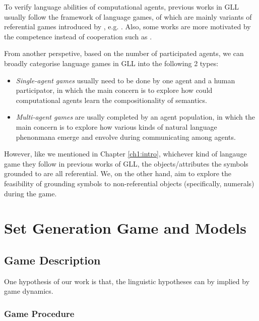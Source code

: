 \documentclass[msc,deptreport]{infthesis} %
\begin{document}
To verify language abilities of computational agents, previous works in GLL usually follow the framework of language games, of which are mainly variants of referential games introduced by \cite{lewis2008convention}, e.g. \cite{hermann2017grounded, havrylov2017emergence}. Also, some works are more motivated by the competence instead of cooperation such as \cite{cao2018emergent}.

From another perspetive, based on the number of participated agents, we can broadly categorise language games in GLL into the following 2 types:
\begin{itemize}
  \item \textit{Single-agent games} usually need to be done by one agent and a human participator, in which the main concern is to explore how could computational agents learn the compositionality of semantics.
  \item \textit{Multi-agent games} are usally completed by an agent population, in which the main concern is to explore how various kinds of natural language phenonmana emerge and envolve during communicating among agents.
\end{itemize}

However, like we mentioned in Chapter \ref{ch1:intro}, whichever kind of langauge game they follow in previous works of GLL, the objects/attributes the symbols grounded to are all referential. We, on the other hand, aim to explore the feasibility of grounding symbols to non-referential objects (specifically, numerals) during the game.


\chapter{Set Generation Game and Models}
\label{ch3:game_model}

\section{Game Description}
\label{sec3.1:game_description}

One hypothesis of our work is that, the linguistic hypotheses can by implied by game dynamics.

\subsection{Game Procedure}
\label{ssec3.1.1:game_procedure}
\end{document}
